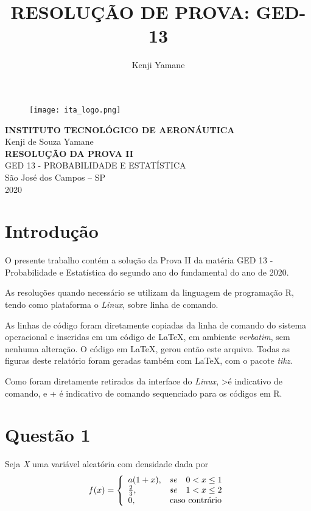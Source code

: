 \documentclass{article}[twocolumn]
\title{RESOLUÇÃO DE PROVA: GED-13}
\author{Kenji Yamane}
\begin{document}
	\begin{figure}[H]
		\centering
		\texttt{[image: ita\_logo.png]}
	\end{figure}
	\begin{center}
		\textbf{\normalsize{INSTITUTO TECNOLÓGICO DE AERONÁUTICA}}\\
		\vspace{2.5cm}
		\large{Kenji de Souza Yamane}\\
		\vspace{4.7cm}
		\textbf{RESOLUÇÃO DA PROVA II}\\
		\large{GED 13 - PROBABILIDADE E ESTATÍSTICA}\\
		\vspace{4.7cm}
		\small{São José dos Campos – SP\\2020}
	\end{center}
	\newpage
	\tableofcontents
	\newpage
	\section{Introdução}
	O presente trabalho contém a solução da Prova II da matéria GED 13 - Probabilidade e
	Estatística do segundo ano do fundamental do ano de 2020.

	As resoluções quando necess\'ario se utilizam da linguagem de programação R, tendo
	como plataforma o \textit{Linux}, sobre linha de comando.

	As linhas de código foram diretamente copiadas da linha de comando do sistema operacional
	e inseridas em um código de \LaTeX, em ambiente \textit{verbatim}, sem nenhuma alteração.
	O código em \LaTeX, gerou então este arquivo. Todas as figuras deste relat\'orio foram
	geradas tamb\'em com \LaTeX, com o pacote \textit{tikz}.
	
	Como foram diretamente retirados da interface do \textit{Linux}, \textgreater é indicativo
	de comando, e + é indicativo de comando sequenciado para os c\'odigos em R.
	\newpage
	\section{Quest\~ao 1}
	Seja \textit{X} uma vari\'avel aleat\'oria com densidade dada por
	\begin{equation}
		f(x) = \left\{\begin{array}{lc}
			a(1 + x), & se \quad 0 < x \leq 1\\
			\frac{2}{3}, & se \quad 1 < x \leq 2 \\
			0, & $caso contr\'ario$
		\end{array}\right.
		\nonumber
	\end{equation}
\end{document}
